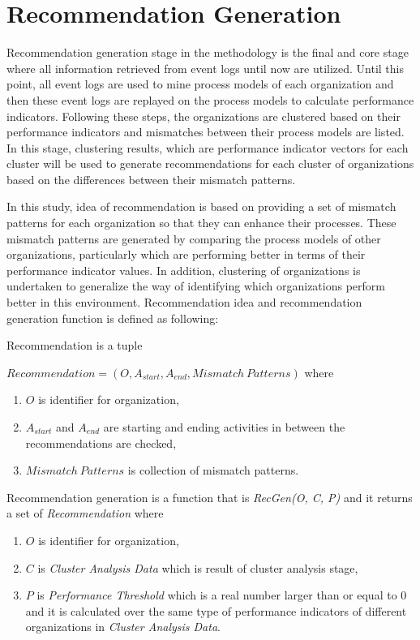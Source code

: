 \section{Recommendation Generation}
\label{sec:recommendation-generation}
Recommendation generation stage in the methodology is the final and core stage where all information retrieved from event logs until now are utilized. Until this point, all event logs are used to mine process models of each organization and then these event logs are replayed on the process models to calculate performance indicators. Following these steps, the organizations are clustered based on their performance indicators and mismatches between their process models are listed. In this stage, clustering results, which are performance indicator vectors for each cluster will be used to generate recommendations for each cluster of organizations based on the differences between their mismatch patterns.

In this study, idea of recommendation is based on providing a set of mismatch patterns for each organization so that they can enhance their processes. These mismatch patterns are generated by comparing the process models of other organizations, particularly which are performing better in terms of their performance indicator values. In addition, clustering of organizations is undertaken to generalize the way of identifying which organizations perform better in this environment. Recommendation idea and recommendation generation function is defined as following:
\theoremstyle{definition}
\begin{definition}
Recommendation is a tuple 

${Recommendation} = (O, A_{start}, A_{end}, Mismatch\ Patterns) $ where 
	\begin{enumerate}
	  \item $O$ is identifier for organization,
	  \item $A_{start}$ and $A_{end}$ are starting and ending activities in between the recommendations are checked,
	  \item $Mismatch\ Patterns$ is collection of mismatch patterns.
	\end{enumerate}
\end{definition}

\theoremstyle{definition}
\begin{definition}
Recommendation generation is a function that is \textit{RecGen(O, C, P)} and it returns a set of \textit{Recommendation} where
	\begin{enumerate}
	  \item $O$ is identifier for organization,
	  \item $C$ is \textit{Cluster Analysis Data} which is result of cluster analysis stage,
	  \item $P$ is \textit{Performance Threshold} which is a real number larger than or equal to 0 and it is calculated over the same type of performance indicators of different organizations in \textit{Cluster Analysis Data}.
	\end{enumerate}
\end{definition}

